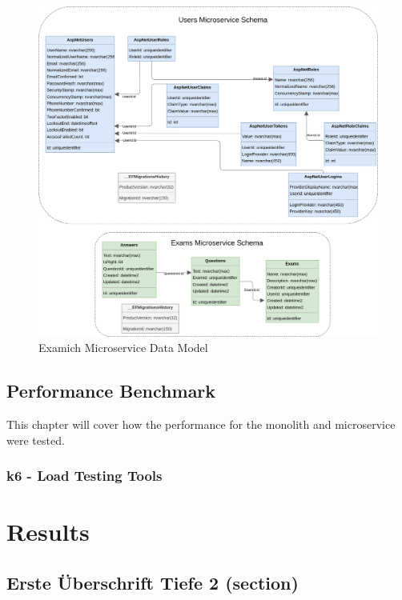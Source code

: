 \documentclass[BIF,Master,nenglish]{twbook}
\begin{document}
\begin{figure} [H]
 \begin{center}
    \includegraphics[width=1\linewidth]{img/ExamichMicroserviceDataModel.png}
 \end{center}
 \caption{Examich Microservice Data Model}
 \label{datamodelmicroservice}
\end{figure}




\section{Performance Benchmark}
This chapter will cover how the performance for the  monolith and microservice were tested.  

\subsection{k6 - Load Testing Tools}


\chapter{Results}

\section{Erste Überschrift Tiefe 2 (section)}
\end{document}
